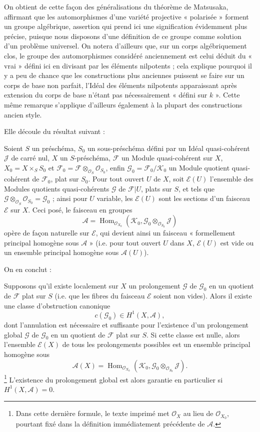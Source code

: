 On obtient de cette façon des généralisations du théorème de Matsusaka,
affirmant que les automorphismes d'une variété projective « polarisée » forment
un groupe algébrique, assertion qui prend ici une signification évidemment plus
précise, puisque nous disposons d'une définition de ce groupe comme solution
d'un problème universel. On notera d'ailleurs que, sur un corps algébriquement
clos, le groupe des automorphismes considéré anciennement est celui déduit du
« vrai » défini ici en divisant par les éléments nilpotents ; cela explique
pourquoi il y a peu de chance que les constructions plus anciennes puissent se
faire sur un corps de base non parfait, l'Idéal des éléments nilpotents
apparaissant après extension du corps de base n'étant pas nécessairement
« défini sur $k$ ». Cette même remarque s'applique d'ailleurs également à la
plupart des constructions ancien style.


Elle découle du résultat suivant :

 Soient $S$ un préschéma, $S_0$ un sous-préschéma
défini par un Idéal quasi-cohérent $\mathcal J$ de carré nul, $X$ un
$S$-préschéma, $\mathcal F$ un Module quasi-cohérent sur $X$,
$X_0=X\times_SS_0$ et
$\mathcal F_0=\mathcal F\otimes_{\mathcal O_S}\mathcal O_{S_0}$, enfin
$\mathcal G_0=\mathcal F_0/\mathcal K_0$ un Module quotient quasi-cohérent de
$\mathcal F_0$, plat sur $S_0$. Pour tout ouvert $U$ de $X$, soit
$\mathcal E(U)$ l'ensemble des Modules quotients quasi-cohérents $\mathcal G$ de
$\mathcal F|U$, plats sur $S$, et tels que
$\mathcal G\otimes_{\mathcal O_S}\mathcal O_{S_0}=\mathcal G_0$ ; ainsi pour
$U$ variable, les $\mathcal E(U)$ sont les sections d'un faisceau $\mathcal E$
sur $X$. Ceci posé, le faisceau en groupes
\[
\mathcal A=\operatorname{Hom}_{\mathcal O_{X_0}}
(\mathcal K_0,\mathcal G_0\otimes_{\mathcal O_{S_0}}\mathcal J)
\]
opère de façon naturelle sur $\mathcal E$, qui devient ainsi un faisceau
« formellement principal homogène sous $\mathcal A$ » (i.e. pour tout ouvert
$U$ dans $X$, $\mathcal E(U)$ est vide ou un ensemble principal homogène sous
$\mathcal A(U)$).

On en conclut :

 Supposons qu'il existe localement sur $X$ un
prolongement $\mathcal G$ de $\mathcal G_0$ en un quotient de $\mathcal F$ plat
sur $S$ (i.e. que les fibres du faisceau $\mathcal E$ soient non vides). Alors
il existe une classe d'obstruction canonique
\[
c(\mathcal G_0)\in H^1(X,\mathcal A),
\]
dont l'annulation est nécessaire et suffisante pour l'existence d'un
prolongement global $\mathcal G$ de $\mathcal G_0$ en un quotient de
$\mathcal F$ plat sur $S$. Si cette classe est nulle, alors l'ensemble
$\mathcal E(X)$ de tous les prolongements possibles est un ensemble principal
homogène sous
\[
\mathcal A(X)=\operatorname{Hom}_{\mathcal O_{X_0}}
(\mathcal K_0,\mathcal G_0\otimes_{\mathcal O_{S_0}}\mathcal J).
\]
\footnote{Dans cette dernière formule, le texte imprimé met
$\mathcal O_X$ au lieu de $\mathcal O_{X_0}$, pourtant fixé dans la définition
immédiatement précédente de $\mathcal A$.}
L'existence du prolongement global est alors garantie en particulier si
$H^1(X,\mathcal A)=0$.

